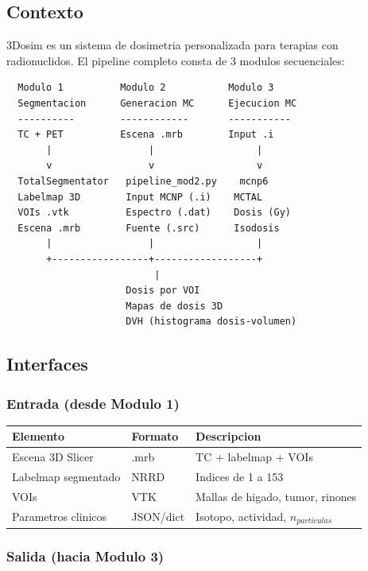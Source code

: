 \documentclass[12pt,a4paper]{article}
\begin{document}
\subsection{Contexto}

3Dosim es un sistema de dosimetria personalizada para terapias con radionuclidos. El pipeline completo consta de 3 modulos secuenciales:

\begin{verbatim}
  Modulo 1          Modulo 2           Modulo 3
  Segmentacion      Generacion MC      Ejecucion MC
  ----------        ------------       -----------
  TC + PET          Escena .mrb        Input .i
       |                 |                  |
       v                 v                  v
  TotalSegmentator   pipeline_mod2.py    mcnp6
  Labelmap 3D        Input MCNP (.i)    MCTAL
  VOIs .vtk          Espectro (.dat)    Dosis (Gy)
  Escena .mrb        Fuente (.src)      Isodosis
       |                 |                  |
       +-----------------+------------------+
                          |
                     Dosis por VOI
                     Mapas de dosis 3D
                     DVH (histograma dosis-volumen)
\end{verbatim}

\subsection{Interfaces}

\subsubsection{Entrada (desde Modulo 1)}

\begin{center}
\begin{tabular}{lll}
\toprule
\textbf{Elemento} & \textbf{Formato} & \textbf{Descripcion} \\
\midrule
Escena 3D Slicer & .mrb & TC + labelmap + VOIs \\
Labelmap segmentado & NRRD & Indices de 1 a 153 \\
VOIs & VTK & Mallas de higado, tumor, rinones \\
Parametros clinicos & JSON/dict & Isotopo, actividad, $n_{particulas}$ \\
\bottomrule
\end{tabular}
\end{center}

\subsubsection{Salida (hacia Modulo 3)}
\end{document}
